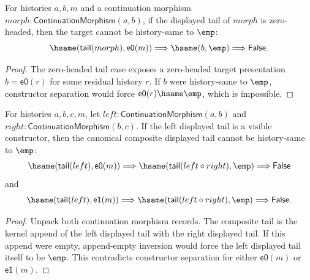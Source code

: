\begin{theorem}
\label{thm:continuation-morphism-e0-tail-target-not-empty}
For histories $a,b,m$ and a continuation morphism
$morph:\mathsf{ContinuationMorphism}(a,b)$, if the displayed tail of $morph$
is zero-headed, then the target cannot be history-same to $\emp$:
$$
\hsame(\mathsf{tail}(morph),\mathsf{e0}(m))
\Longrightarrow
\hsame(b,\emp)
\Longrightarrow
\mathsf{False}.
$$
\end{theorem}
\begin{proof}
The zero-headed tail case exposes a zero-headed target presentation
$b=\mathsf{e0}(r)$ for some residual history $r$. If $b$ were history-same to
$\emp$, constructor separation would force $\mathsf{e0}(r)\hsame\emp$, which is
impossible.
\end{proof}

\begin{theorem}
\label{thm:continuation-morphism-comp-left-visible-tail-empty-absurd}
For histories $a,b,c,m$, let $left:\mathsf{ContinuationMorphism}(a,b)$ and
$right:\mathsf{ContinuationMorphism}(b,c)$. If the left displayed tail is a
visible constructor, then the canonical composite displayed tail cannot be
history-same to $\emp$:
$$
\hsame(\mathsf{tail}(left),\mathsf{e0}(m))
\Longrightarrow
\hsame(\mathsf{tail}(left\circ right),\emp)\Longrightarrow\mathsf{False}
$$
and
$$
\hsame(\mathsf{tail}(left),\mathsf{e1}(m))
\Longrightarrow
\hsame(\mathsf{tail}(left\circ right),\emp)\Longrightarrow\mathsf{False}.
$$
\end{theorem}
\begin{proof}
Unpack both continuation morphism records. The composite tail is the kernel
append of the left displayed tail with the right displayed tail. If this append
were empty, append-empty inversion would force the left displayed tail itself
to be $\emp$. This contradicts constructor separation for either
$\mathsf{e0}(m)$ or $\mathsf{e1}(m)$.
\end{proof}

